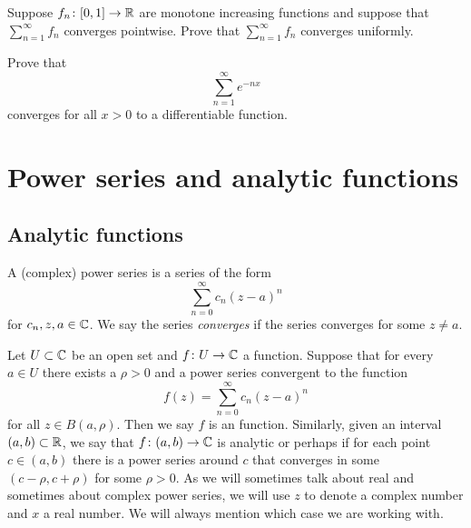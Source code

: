 \begin{exercise}
Suppose $f_n \colon [0,1] \to {\mathbb{R}}$ are monotone increasing functions and
suppose that $\sum_{n=1}^\infty f_n$ converges pointwise.  Prove that
$\sum_{n=1}^\infty f_n$
converges uniformly.
\end{exercise}

\begin{exercise}
Prove that
\begin{equation*}
\sum_{n=1}^\infty e^{-nx}
\end{equation*}
converges for all $x > 0$ to a differentiable function.
\end{exercise}


\sectionnewpage
\section{Power series and analytic functions}
\label{sec:analfuncs}



\subsection{Analytic functions}

A (complex) power series is a series of the form
\begin{equation*}
\sum_{n=0}^\infty c_n {(z-a)}^n
\end{equation*}
for $c_n, z, a \in {\mathbb{C}}$.  We say the series
\emph{converges} if the series converges for
some $z \not= a$.

Let $U \subset {\mathbb{C}}$ be an open set and
$f \colon U \to {\mathbb{C}}$ a function.
Suppose that for every $a \in U$ there exists a $\rho > 0$ and a power
series convergent to the function
\begin{equation*}
f(z) = \sum_{n=0}^\infty c_n {(z-a)}^n
\end{equation*}
for all $z \in B(a,\rho)$.
Then we say $f$ is an \emph{} function.
Similarly, given an interval $(a,b) \subset {\mathbb{R}}$, we say that $f \colon (a,b) \to {\mathbb{C}}$
is analytic or perhaps \emph{}
if for each point $c \in
(a,b)$ there is a power series around $c$ that converges in some
$(c-\rho,c+\rho)$
for some $\rho > 0$.
As we will sometimes talk about real and sometimes about complex power
series, we will use $z$ to denote a complex number and $x$ a real number.
We will always mention which case we are working with.


